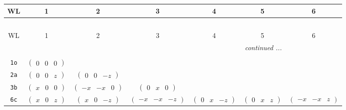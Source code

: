 \documentclass[fleqn,9pt,landscape]{jsarticle}
\begin{document}
\begin{center}
\renewcommand{\arraystretch}{1.2}
\begin{longtable}{ccccccc}
 \hline \hline
WL & 1 & 2 & 3 & 4 & 5 & 6 \\ \hline \endfirsthead

\multicolumn{6}{l}{\tablename\ \thetable{}} \\
 \hline \hline
WL & 1 & 2 & 3 & 4 & 5 & 6 \\ \hline \endhead

 \hline \hline
\multicolumn{6}{r}{\footnotesize\it continued ...} \\ \endfoot

 \hline \hline
\multicolumn{6}{r}{} \\ \endlastfoot

{\tt 1o} & $ \begin{pmatrix} 0 & 0 & 0 \end{pmatrix} $ & $  $ & $  $ & $  $ & $  $ & $  $ \\ \hline
{\tt 2a} & $ \begin{pmatrix} 0 & 0 & z \end{pmatrix} $ & $ \begin{pmatrix} 0 & 0 & - z \end{pmatrix} $ & $  $ & $  $ & $  $ & $  $ \\ \hline
{\tt 3b} & $ \begin{pmatrix} x & 0 & 0 \end{pmatrix} $ & $ \begin{pmatrix} - x & - x & 0 \end{pmatrix} $ & $ \begin{pmatrix} 0 & x & 0 \end{pmatrix} $ & $  $ & $  $ & $  $ \\ \hline
{\tt 6c} & $ \begin{pmatrix} x & 0 & z \end{pmatrix} $ & $ \begin{pmatrix} x & 0 & - z \end{pmatrix} $ & $ \begin{pmatrix} - x & - x & - z \end{pmatrix} $ & $ \begin{pmatrix} 0 & x & - z \end{pmatrix} $ & $ \begin{pmatrix} 0 & x & z \end{pmatrix} $ & $ \begin{pmatrix} - x & - x & z \end{pmatrix} $ \\ \hline

\end{longtable}
\end{center}
\end{document}
